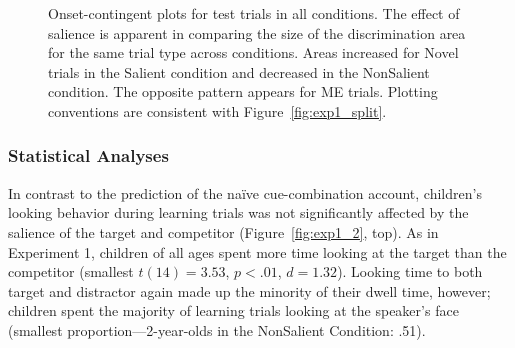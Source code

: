 \documentclass[man,floatsintext]{apa6}
\begin{document}
\begin{figure}[tb]
	\caption{\label{fig:exp1and2_split} Onset-contingent plots for test trials in all conditions. The effect of salience is apparent in comparing the size of the discrimination area for the same trial type across conditions. Areas increased for Novel trials in the Salient condition and decreased in the NonSalient condition. The opposite pattern appears for ME trials. Plotting conventions are consistent with Figure~\ref{fig:exp1_split}.}
\end{figure}

\subsubsection{Statistical Analyses}

In contrast to the prediction of the na\"{i}ve cue-combination account, children's looking behavior during learning trials was not significantly affected by the salience of the target and competitor (Figure~\ref{fig:exp1_2}, top). As in Experiment 1, children of all ages spent more time looking at the target than the competitor (smallest $t(14)  = 3.53$, $p < .01$, $d = 1.32$). Looking time to both target and distractor again made up the minority of their dwell time, however; children spent the majority of learning trials looking at the speaker's face (smallest proportion---2-year-olds in the NonSalient Condition: .51).
\end{document}
